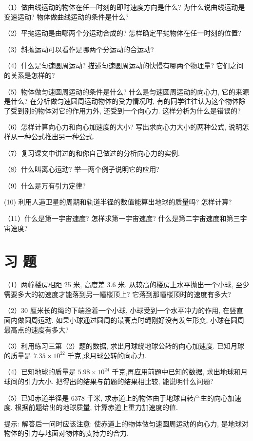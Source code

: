 \documentclass[10pt]{article}
\begin{document}
（1）做曲线运动的物体在任一时刻的即时速度方向是什么? 为什么说曲线运动是变速运动? 物体做曲线运动的条件是什么?

（2）平抛运动是由哪两个分运动合成的? 怎样确定平抛物体在任一时刻的位置?

（3）斜抛运动可以看作是哪两个分运动的合运动?

（4）什么是匀速圆周运动? 描述匀速圆周运动的快慢有哪两个物理量? 它们之间的关系是怎样的?

（5）物体做匀速圆周运动的条件是什么? 什么是匀速圆周运动的向心力, 它的来源是什么? 在分析做匀速圆周运动物体的受力情况时, 有的同学往往认为这个物体除了受到别的物体对它的作用力外, 还受到一个向心力. 这样分析为什么是错误的?

（6）怎样计算向心力和向心加速度的大小? 写出求向心力大小的两种公式, 说明怎样从一种公式推出另一种公式.

（7）复习课文中讲过的和你自己做过的分析向心力的实例.

（8）什么叫离心运动? 举一两个例子说明它的应用?

（9）什么是万有引力定律?

(10) 利用人造卫星的周期和轨道半径的数值能算出地球的质量吗? 怎样计算?

（11）什么是第一宇宙速度? 怎样求第一宇宙速度? 什么是第二宇宙速度和第三宇宙速度?

\section*{习 题}

（1）两幢楼房相距 25 米, 高度差 3.6 米. 从较高的楼房上水平抛出一个小球, 至少需要多大的初速度才能落到另一幢楼顶上? 它落到那幢楼顶时的速度有多大?

（2）30 厘米长的绳的下端拴着一个小球, 小球受到一个水平冲力的作用, 在竖直面内做圆周运动. 如果小球通过圆周的最高点时绳刚好没有发生形变, 小球在圆周最高点的速度有多大?

（3）利用练习三第（2）题的数据, 求出月球绕地球公转的向心加速度. 已知月球的质量是 \({7.35} \times {10}^{22}\) 千克,求月球公转的向心力.

（4）已知地球的质量是 \({5.98} \times {10}^{24}\) 千克,再应用前题中已知的数据, 求出地球和月球间的引力大小. 把得出的结果与前题的结果相比较, 能说明什么问题?

（5）已知赤道半径是 6378 千米, 求赤道上的物体由于地球自转产生的向心加速度. 根据前题给出的地球质量, 计算赤道上重力加速度的值.

提示: 解答后一问时应该注意: 使赤道上的物体做匀速圆周运动的向心力, 是地球对物体的引力与地面对物体的支持力的合力.
\end{document}
